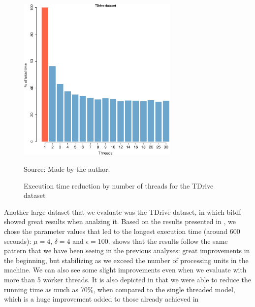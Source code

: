 {\begin{figure}[h!]
    \centering
    \caption{Execution time reduction by number of threads for the TDrive dataset}
    \centerline{\includegraphics[width=0.7\textwidth]{images/TDrive_thread.eps}}
    \footnotesize{Source: Made by the author.}
    \label{fig:tdrive_threads}
\end{figure}

Another large dataset that we evaluate was the TDrive dataset, in which \ac{bitdf} showed great results when analzing
it.  Based on the results presented in , we chose the parameter values that led to the longest
execution time (around 600 seconds): $\mu=4$, $\delta=4$ and $\epsilon=100$.  shows that the
results follow the same pattern that we have been seeing in the previous analyses: great improvements in the beginning,
but stabilizing as we exceed the number of processing units in the machine. We can also see some slight improvements
even when we evaluate with more than 5 worker threads. It is also depicted in  that we were
able to reduce the running time as much as 70\%, when compared to the single threaded model, which is a huge improvement
added to those already achieved in 

}

